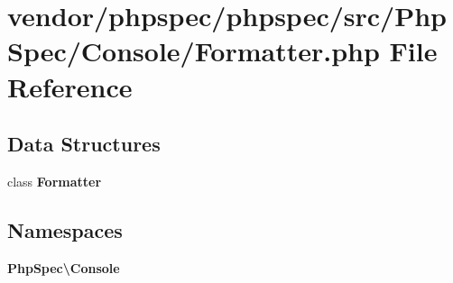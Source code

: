\section{vendor/phpspec/phpspec/src/\+Php\+Spec/\+Console/\+Formatter.php File Reference}
\label{phpspec_2phpspec_2src_2_php_spec_2_console_2_formatter_8php}
\subsection*{Data Structures}
\begin{DoxyCompactItemize}
\item 
class {\bf Formatter}
\end{DoxyCompactItemize}
\subsection*{Namespaces}
\begin{DoxyCompactItemize}
\item 
 {\bf Php\+Spec\textbackslash{}\+Console}
\end{DoxyCompactItemize}
